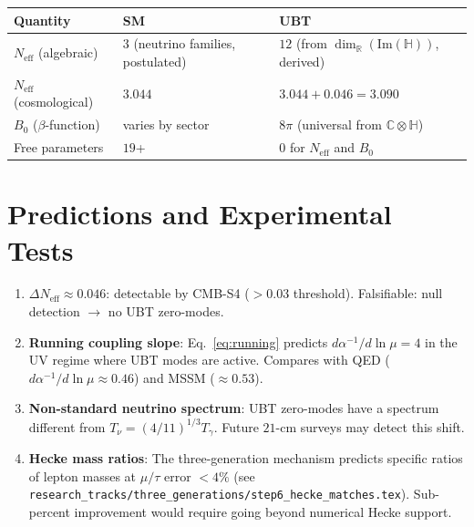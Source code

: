 \documentclass[12pt,a4paper]{article}
\theoremstyle{definition}
\theoremstyle{remark}
\newcommand{\C}{\mathbb{C}}
\newcommand{\R}{\mathbb{R}}
\renewcommand{\H}{\mathbb{H}}
\newcommand{\im}{\mathrm{Im}}
\begin{document}
\begin{center}
\begin{tabular}{lll}
  \toprule
  \textbf{Quantity} & \textbf{SM} & \textbf{UBT} \\
  \midrule
  $N_{\mathrm{eff}}$ (algebraic) & $3$ (neutrino families, postulated)
    & $12$ (from $\dim_\R(\im(\H))$, derived) \\
  $N_{\mathrm{eff}}$ (cosmological) & $3.044$ & $3.044 + 0.046 = 3.090$ \\
  $B_0$ ($\beta$-function) & varies by sector
    & $8\pi$ (universal from $\C\otimes\H$) \\
  Free parameters & $19$+ & $0$ for $N_{\mathrm{eff}}$ and $B_0$ \\
  \bottomrule
\end{tabular}
\end{center}

\section{Predictions and Experimental Tests}
\label{sec:predictions}

\begin{enumerate}
  \item[(P1)] \textbf{$\Delta N_{\mathrm{eff}} \approx 0.046$}:
    detectable by CMB-S4 ($> 0.03$ threshold).
    Falsifiable: null detection $\to$ no UBT zero-modes.

  \item[(P2)] \textbf{Running coupling slope}:
    Eq.~\eqref{eq:running} predicts $d\alpha^{-1}/d\ln\mu = 4$
    in the UV regime where UBT modes are active.
    Compares with QED ($d\alpha^{-1}/d\ln\mu \approx 0.46$) and
    MSSM ($\approx 0.53$).

  \item[(P3)] \textbf{Non-standard neutrino spectrum}:
    UBT zero-modes have a spectrum different from $T_\nu = (4/11)^{1/3}T_\gamma$.
    Future $21$-cm surveys may detect this shift.

  \item[(P4)] \textbf{Hecke mass ratios}:
    The three-generation mechanism predicts specific ratios of lepton
    masses at $\mu/\tau$ error $< 4\%$ (see
    \texttt{research\_tracks/three\_generations/step6\_hecke\_matches.tex}).
    Sub-percent improvement would require going beyond numerical Hecke support.
\end{enumerate}
\end{document}
